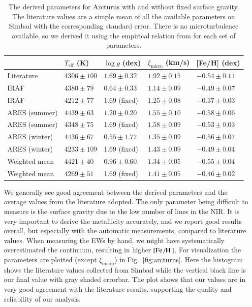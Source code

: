 \documentclass{aa}
\begin{document}
\begin{table}[htb!]
    \caption{The derived parameters for Arcturus with and without fixed surface
             gravity. The literature values are a simple mean of all the
             available parameters on Simbad with the corresponding standard
             error. There is no microturbulence available, so we derived it
             using the empirical relation from \citet{Adibekyan2015} for each
             set of parameters.}
    \label{tab:arcturus}
    \centering
    \begin{tabular}{lllll}
      \hline\hline
                      & $T_\mathrm{eff}$ (K) &  $\log g$ (dex)  &   $\xi_\mathrm{micro}$ (km/s)   & [Fe/H] (dex)     \\
      \hline
        Literature    & $4306 \pm 100$       &  $1.69 \pm 0.32$ &    $1.92 \pm 0.15$              & $-0.54 \pm 0.11$ \\
      \hline
        IRAF          & $4380 \pm  79$       &  $0.64 \pm 0.33$ &    $1.14 \pm 0.09$              & $-0.49 \pm 0.07$ \\
        IRAF          & $4212 \pm  77$       &   1.69 (fixed)   &    $1.25 \pm 0.08$              & $-0.37 \pm 0.03$ \\
      \hline
        ARES (summer) & $4439 \pm  63$       &  $1.20 \pm 0.20$ &    $1.55 \pm 0.10$              & $-0.58 \pm 0.06$ \\
        ARES (summer) & $4348 \pm  75$       &   1.69 (fixed)   &    $1.58 \pm 0.09$              & $-0.53 \pm 0.03$ \\
        ARES (winter) & $4436 \pm  67$       &  $0.55 \pm 1.77$ &    $1.35 \pm 0.09$              & $-0.56 \pm 0.07$ \\
        ARES (winter) & $4233 \pm 109$       &   1.69 (fixed)   &    $1.43 \pm 0.09$              & $-0.49 \pm 0.04$ \\
      \hline
        Weighted mean & $4421 \pm  40$       &  $0.96 \pm 0.60$ &    $1.34 \pm 0.05$              & $-0.55 \pm 0.04$ \\
        Weighted mean & $4269 \pm  51$       &   1.69 (fixed)   &    $1.41 \pm 0.05$              & $-0.46 \pm 0.02$ \\
      \hline
    \end{tabular}
\end{table}

We generally see good agreement between the derived parameters and the average
values from the literature adopted. The only parameter being difficult to
measure is the surface gravity due to the low number of  lines in
the NIR. It is very important to derive the metallicity accurately, and we
report good results overall, but especially with the automatic measurements,
compared to literature values. When measuring the EWs by hand, we might have
systematically overestimated the continuum, resulting in higher
$[\ion{Fe}/\ion{H}]$. For visualization the parameters are plotted (except
$\xi_\mathrm{micro}$) in Fig.~\ref{fig:arcturus}. Here the histogram shows the
literature values collected from Simbad while the vertical black line is our
final value with gray shaded errorbar. The plot shows that our values are in
very good agreement with the literature results, supporting the quality and
reliability of our analysis.
\end{document}
